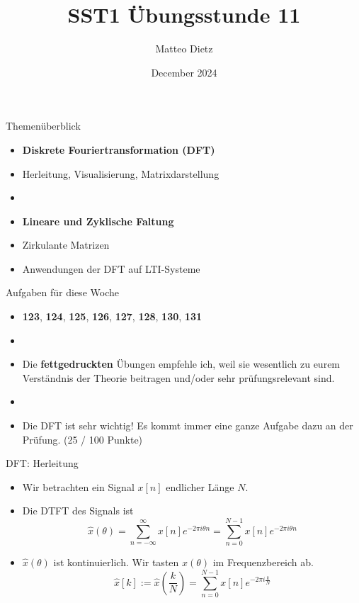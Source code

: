 \documentclass[14pt, aspectratio=169, handout]{beamer}
\title{SST1 Übungsstunde 11}
\author{Matteo Dietz}
\date{December 2024}
\begin{document}
\maketitle

\begin{frame}{Themenüberblick}
    \begin{itemize}
        \item \textbf{Diskrete Fouriertransformation (DFT)}
        \item[] Herleitung, Visualisierung, Matrixdarstellung
        \item[] 
        \item \textbf{Lineare und Zyklische Faltung}
        \item[] Zirkulante Matrizen
        \item[] Anwendungen der DFT auf LTI-Systeme
    \end{itemize}
\end{frame}

\begin{frame}{Aufgaben für diese Woche}
    \begin{itemize}
        \item[] \textbf{123}, \textbf{124}, \textbf{125}, \textbf{126}, \textbf{127}, \textbf{128}, \textbf{130}, \textbf{131}
        \item[] 
        \item[] Die \textbf{fettgedruckten} Übungen empfehle ich, weil sie wesentlich zu eurem Verständnis der Theorie beitragen und/oder sehr prüfungsrelevant sind.
        \item[] 
        \item[] Die DFT ist \textcolor{myred}{sehr wichtig}! Es kommt immer eine ganze Aufgabe dazu an der Prüfung. (25 / 100 Punkte)
    \end{itemize}
\end{frame}

\begin{frame}{DFT: Herleitung}
    \begin{itemize}
        \item Wir betrachten ein Signal $x[n]$ endlicher Länge $N$.
        \item Die DTFT des Signals ist
        $$\hat{x}(\theta) = \sum_{n=-\infty}^\infty x[n]e^{-2 \pi i \theta n} = \sum_{n=0}^{N-1} x[n]e^{-2 \pi i \theta n}$$
        \item $\hat{x}(\theta)$ ist kontinuierlich. Wir tasten $\hat{x}(\theta)$ im Frequenzbereich ab.
        $$\hat{x}[k] := \hat{x}\left(\frac{k}{N}\right) = \sum_{n=0}^{N-1} x[n]e^{-2 \pi i \frac{k}{N}} $$
    \end{itemize}
\end{frame}
\end{document}

